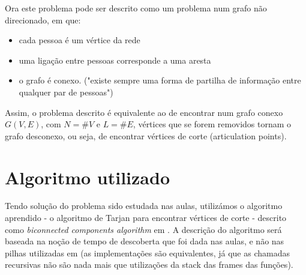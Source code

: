 \documentclass{scrartcl}
\begin{document}
Ora este problema pode ser descrito como um problema num grafo não direcionado, em que:
\begin{itemize}
\item cada pessoa é um vértice da rede 
\item uma ligação entre pessoas corresponde a uma aresta 
\item o grafo é conexo. ("existe sempre uma forma de partilha de informação entre qualquer par de pessoas")
\end{itemize}

Assim, o problema descrito é equivalente ao de encontrar num grafo conexo $G(V,E)$, com $N = \#V$ e $L = \#E$, vértices que se forem removidos tornam o grafo desconexo, ou seja, de encontrar vértices de corte (articulation points).


\section*{Algoritmo utilizado}
Tendo solução do problema sido estudada nas aulas, utilizámos o algoritmo aprendido - o algoritmo de Tarjan para encontrar vértices de corte - descrito como \textit{biconnected components algorithm} em \cite{Hopcroft:EAGM}. A descrição do algoritmo será baseada na noção de tempo de descoberta que foi dada nas aulas, e não nas pilhas utilizadas em \cite{Hopcroft:EAGM} (as implementações são equivalentes, já que as chamadas recursivas não são nada mais que utilizações da stack das frames das funções).
\end{document}
